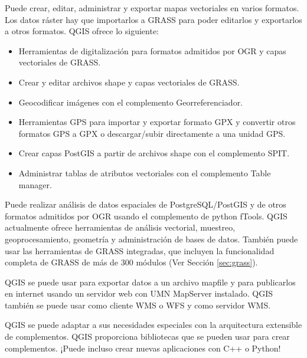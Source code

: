 
Puede crear, editar, administrar y exportar mapas vectoriales en varios formatos. Los datos ráster
hay que importarlos a GRASS para poder editarlos y exportarlos a otros
formatos. QGIS ofrece lo siguiente: 

\begin{itemize}
\item Herramientas de digitalización para formatos admitidos por OGR y capas vectoriales de GRASS.
\item Crear y editar archivos shape y capas vectoriales de GRASS.
\item Geocodificar imágenes con el complemento Georreferenciador.
\item Herramientas GPS para importar y exportar formato GPX y convertir otros formatos GPS
a GPX o descargar/subir directamente a una unidad GPS.
\item Crear capas PostGIS a partir de archivos shape con el complemento SPIT.
\item Administrar tablas de atributos vectoriales con el complemento Table manager.
\end{itemize}


Puede realizar análisis de datos espaciales de PostgreSQL/PostGIS y de otros formatos
admitidos por OGR usando el complemento de python fTools. QGIS actualmente ofrece
herramientas de análisis vectorial, muestreo, geoprocesamiento, geometría y administración de bases de datos. También puede usar las herramientas de GRASS integradas, que 
incluyen la funcionalidad completa de GRASS de más de 300 módulos (Ver
Sección \ref{sec:grass}).


QGIS se puede usar para exportar datos a un archivo mapfile y para publicarlos en
internet usando un servidor web con UMN MapServer instalado. QGIS también se
puede usar como cliente WMS o WFS y como servidor WMS.


QGIS se puede adaptar a sus necesidades especiales con la arquitectura extensible
de complementos. QGIS proporciona bibliotecas que se pueden usar para crear
complementos. ¡Puede incluso crear nuevas aplicaciones con C++ o Python!

